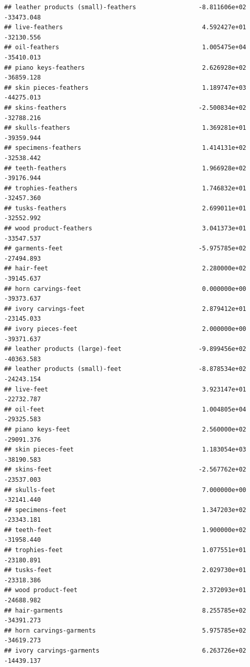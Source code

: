 \documentclass[
  12pt,
]{article}
\begin{document}
\begin{verbatim}
## leather products (small)-feathers                 -8.811606e+02  -33473.048
## live-feathers                                      4.592427e+01  -32130.556
## oil-feathers                                       1.005475e+04  -35410.013
## piano keys-feathers                                2.626928e+02  -36859.128
## skin pieces-feathers                               1.189747e+03  -44275.013
## skins-feathers                                    -2.500834e+02  -32788.216
## skulls-feathers                                    1.369281e+01  -39359.944
## specimens-feathers                                 1.414131e+02  -32538.442
## teeth-feathers                                     1.966928e+02  -39176.944
## trophies-feathers                                  1.746832e+01  -32457.360
## tusks-feathers                                     2.699011e+01  -32552.992
## wood product-feathers                              3.041373e+01  -33547.537
## garments-feet                                     -5.975785e+02  -27494.893
## hair-feet                                          2.280000e+02  -39145.637
## horn carvings-feet                                 0.000000e+00  -39373.637
## ivory carvings-feet                                2.879412e+01  -23145.033
## ivory pieces-feet                                  2.000000e+00  -39371.637
## leather products (large)-feet                     -9.899456e+02  -40363.583
## leather products (small)-feet                     -8.878534e+02  -24243.154
## live-feet                                          3.923147e+01  -22732.787
## oil-feet                                           1.004805e+04  -29325.583
## piano keys-feet                                    2.560000e+02  -29091.376
## skin pieces-feet                                   1.183054e+03  -38190.583
## skins-feet                                        -2.567762e+02  -23537.003
## skulls-feet                                        7.000000e+00  -32141.440
## specimens-feet                                     1.347203e+02  -23343.181
## teeth-feet                                         1.900000e+02  -31958.440
## trophies-feet                                      1.077551e+01  -23180.891
## tusks-feet                                         2.029730e+01  -23318.386
## wood product-feet                                  2.372093e+01  -24688.982
## hair-garments                                      8.255785e+02  -34391.273
## horn carvings-garments                             5.975785e+02  -34619.273
## ivory carvings-garments                            6.263726e+02  -14439.137

\end{verbatim}
\end{document}
